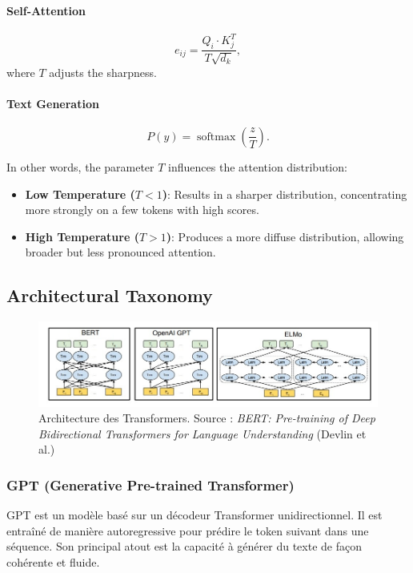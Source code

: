 \documentclass{article}
\begin{document}
\paragraph{Self-Attention}
\[
e_{ij} = \frac{Q_i \cdot K_j^T}{T\sqrt{d_k}},
\]
where \(T\) adjusts the sharpness.

\paragraph{Text Generation}
\[
P(y) = \operatorname{softmax}\left(\frac{z}{T}\right).
\]

In other words, the parameter \( T \) influences the attention distribution:
\begin{itemize}
    \item \textbf{Low Temperature (\( T < 1 \))}: Results in a sharper distribution, concentrating more strongly on a few tokens with high scores.
    \item \textbf{High Temperature (\( T > 1 \))}: Produces a more diffuse distribution, allowing broader but less pronounced attention.
\end{itemize}


\subsection{Architectural Taxonomy}
\begin{figure}[ht]
    \centering
    \includegraphics[width=\linewidth]{graphics/S7Transformers/transformers_architectures.jpg}
    \caption{Architecture des Transformers. Source : \textit{BERT: Pre-training of Deep Bidirectional Transformers for Language Understanding} (Devlin et al.)}
    \label{fig:transformers_architecture}
\end{figure}

\subsubsection{GPT (Generative Pre-trained Transformer)}
GPT est un modèle basé sur un décodeur Transformer unidirectionnel. Il est entraîné de manière autoregressive pour prédire le token suivant dans une séquence. Son principal atout est la capacité à générer du texte de façon cohérente et fluide.
\end{document}
